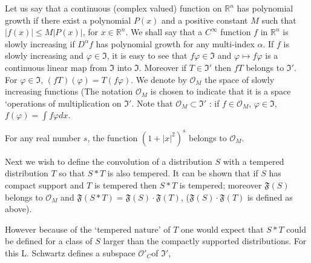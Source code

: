 Let us say that a continuous (complex valued) function on $\mathbb{R}^{n}$ has polynomial growth if there exist a polynomial $P(x)$ and a positive constant $M$ such that $|f(x)|\leq M|P(x)|$, for $x\in \mathbb{R}^{n}$. We shall say that a $C^{\infty}$ function $f$ in $\mathbb{R}^{n}$ is slowly increasing if $D^{\alpha}f$ has polynomial growth for any multi-index $\alpha$. If $f$ is slowly increasing and $\varphi\in \mathfrak{I}$, it is easy to see that $f\varphi \in \mathfrak{I}$ and $\varphi \mapsto f\varphi$ is a continuous linear map from $\mathfrak{I}$ into $\mathfrak{I}$. Moreover if $T\in \mathfrak{I}'$ then $fT$ belongs to $\mathfrak{I}'$. For $\varphi \in \mathfrak{I}$, $(fT)(\varphi)=T(f\varphi)$. We denote by $\mathcal{O}_{M}$ the space of slowly increasing functions (The notation $\mathcal{O}_{M}$ is chosen to indicate that it is a space `operations of multiplication on $\mathfrak{I}'$. Note that $\mathcal{O}_{M}\subset \mathfrak{I}'$ : if $f\in \mathcal{O}_{M}$, $\varphi \in \mathfrak{I}$, $f(\varphi)=\int f\varphi dx$.

\begin{example*}
For any real number $s$, the function $(1+|x|^{2})^{s}$ belongs to $\mathcal{O}_{M}$. 

Next we wish to define the convolution of a distribution $S$ with a tempered distribution $T$ so that $S\ast T$ is also tempered. It can be shown that if $S$ has compact support and $T$ is tempered then $S\ast T$ is tempered; moreover $\mathfrak{F}(S)$ belongs to $\mathcal{O}_{M}$ and $\mathfrak{F}(S\ast T)=\mathfrak{F}(S)\cdot \mathfrak{F}(T)$, ($\mathfrak{F}(S)\cdot \mathfrak{F}(T)$ is defined as above).
\end{example*}

However because of the `tempered nature' of $T$ one would expect that $S\ast T$ could be defined for a class of $S$ larger than the compactly supported distributions. For this L. Schwartz defines a subspace $\mathcal{O}'_{C}$\pageoriginale  of $\mathfrak{I}'$, 

